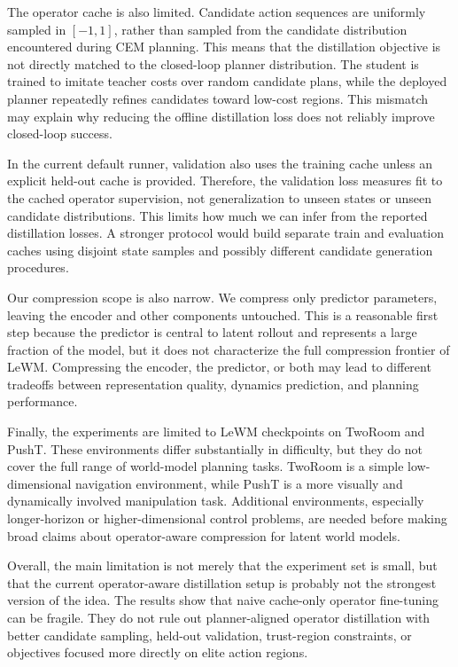 \documentclass[11pt]{article}
\begin{document}
The operator cache is also limited. Candidate action sequences are uniformly sampled in \([-1,1]\), rather than sampled from the candidate distribution encountered during CEM planning. This means that the distillation objective is not directly matched to the closed-loop planner distribution. The student is trained to imitate teacher costs over random candidate plans, while the deployed planner repeatedly refines candidates toward low-cost regions. This mismatch may explain why reducing the offline distillation loss does not reliably improve closed-loop success.

In the current default runner, validation also uses the training cache unless an explicit held-out cache is provided. Therefore, the validation loss measures fit to the cached operator supervision, not generalization to unseen states or unseen candidate distributions. This limits how much we can infer from the reported distillation losses. A stronger protocol would build separate train and evaluation caches using disjoint state samples and possibly different candidate generation procedures.

Our compression scope is also narrow. We compress only predictor parameters, leaving the encoder and other components untouched. This is a reasonable first step because the predictor is central to latent rollout and represents a large fraction of the model, but it does not characterize the full compression frontier of LeWM. Compressing the encoder, the predictor, or both may lead to different tradeoffs between representation quality, dynamics prediction, and planning performance.

Finally, the experiments are limited to LeWM checkpoints on TwoRoom and PushT. These environments differ substantially in difficulty, but they do not cover the full range of world-model planning tasks. TwoRoom is a simple low-dimensional navigation environment, while PushT is a more visually and dynamically involved manipulation task. Additional environments, especially longer-horizon or higher-dimensional control problems, are needed before making broad claims about operator-aware compression for latent world models.

Overall, the main limitation is not merely that the experiment set is small, but that the current operator-aware distillation setup is probably not the strongest version of the idea. The results show that naive cache-only operator fine-tuning can be fragile. They do not rule out planner-aligned operator distillation with better candidate sampling, held-out validation, trust-region constraints, or objectives focused more directly on elite action regions.
\end{document}
